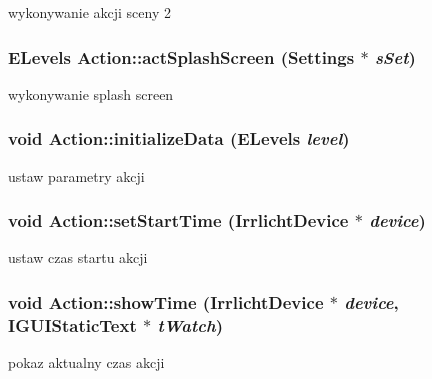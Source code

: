 \label{class_action_af11f32ac4273cc82c15cf5f3263c8a51}
wykonywanie akcji sceny 2 \hypertarget{class_action_afe35837862a01951fdf63f853bd79d48}{
\subsubsection[{actSplashScreen}]{\setlength{\rightskip}{0pt plus 5cm}ELevels Action::actSplashScreen ({\bf Settings} $\ast$ {\em sSet})}}
\label{class_action_afe35837862a01951fdf63f853bd79d48}
wykonywanie splash screen \hypertarget{class_action_a7839a872e9878d62b67a5c5919a4f1d9}{
\subsubsection[{initializeData}]{\setlength{\rightskip}{0pt plus 5cm}void Action::initializeData (ELevels {\em level})}}
\label{class_action_a7839a872e9878d62b67a5c5919a4f1d9}
ustaw parametry akcji \hypertarget{class_action_a2c16320affb3e146dfd846c381f1eb2e}{
\subsubsection[{setStartTime}]{\setlength{\rightskip}{0pt plus 5cm}void Action::setStartTime (IrrlichtDevice $\ast$ {\em device})}}
\label{class_action_a2c16320affb3e146dfd846c381f1eb2e}
ustaw czas startu akcji \hypertarget{class_action_a729929419a9d90402f0a882257725472}{
\subsubsection[{showTime}]{\setlength{\rightskip}{0pt plus 5cm}void Action::showTime (IrrlichtDevice $\ast$ {\em device}, \/  IGUIStaticText $\ast$ {\em tWatch})}}
\label{class_action_a729929419a9d90402f0a882257725472}
pokaz aktualny czas akcji 

